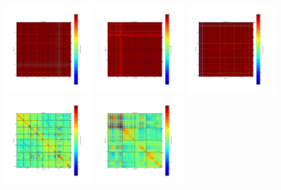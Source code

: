 \begin{figure}[ht] %
\begin{center}
\includegraphics[width=0.3\textwidth]{Figures/DarkTests/corrmat_TOI_array_1_20161213s72.pdf}
\includegraphics[width=0.3\textwidth]{Figures/DarkTests/corrmat_TOI_array_2_20161213s72.pdf}
\includegraphics[width=0.3\textwidth]{Figures/DarkTests/corrmat_TOI_array_3_20161213s72.pdf}
\includegraphics[width=0.3\textwidth]{Figures/DarkTests/corrmat_TOI_CM_array_1_20161213s72.pdf}
\includegraphics[width=0.3\textwidth]{Figures/DarkTests/corrmat_TOI_CM_array_2_20161213s72.pdf}

\end{center}
\end{figure}
